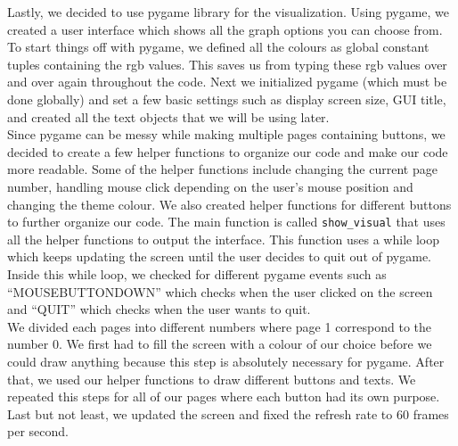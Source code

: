 \documentclass[fontsize=11pt]{article}
\begin{document}
\tab Lastly, we decided to use pygame library for the visualization. Using pygame, we created a user interface which shows all the graph options you can choose from. To start things off with pygame, we defined all the colours as global constant tuples containing the rgb values. This saves us from typing these rgb values over and over again throughout the code. Next we initialized pygame (which must be done globally) and set a few basic settings such as display screen size, GUI title, and created all the text objects that we will be using later.\\

\tab Since pygame can be messy while making multiple pages containing buttons, we decided to create a few helper functions to organize our code and make our code more readable. Some of the helper functions include changing the current page number, handling mouse click depending on the user’s mouse position and changing the theme colour. We also created helper functions for different buttons to further organize our code. The main function is called \texttt{show\_visual} that uses all the helper functions to output the interface. This function uses a while loop which keeps updating the screen until the user decides to quit out of pygame. Inside this while loop, we checked for different pygame events such as “MOUSEBUTTONDOWN” which checks when the user clicked on the screen and “QUIT” which checks when the user wants to quit.\\

\tab We divided each pages into different numbers where page 1 correspond to the number  0. We first had to fill the screen with a colour of our choice before we could draw anything because this step is absolutely necessary for pygame. After that, we used our helper functions to draw different buttons and texts. We repeated this steps for all of our pages where each button had its own purpose. Last but not least, we updated the screen and fixed the refresh rate to 60 frames per second. 
\end{document}
